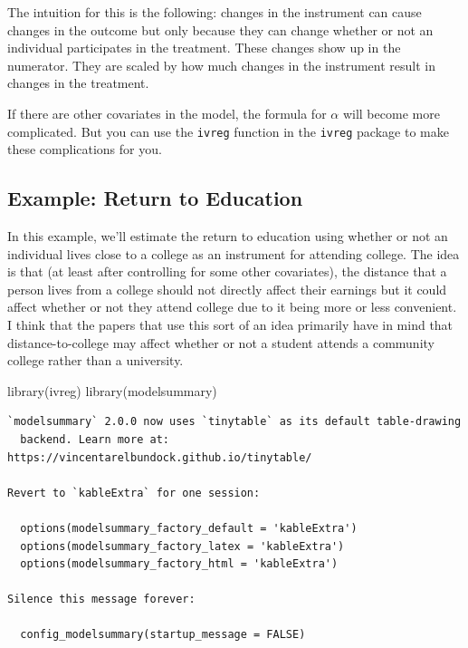 \documentclass[
  letterpaper,
  DIV=11,
  numbers=noendperiod]{scrreprt}
\newenvironment{Shaded}{\begin{snugshade}}{\end{snugshade}}
\newcommand{\FunctionTok}[1]{\textcolor[rgb]{0.28,0.35,0.67}{#1}}
\newcommand{\NormalTok}[1]{\textcolor[rgb]{0.00,0.23,0.31}{#1}}
\begin{document}
The intuition for this is the following: changes in the instrument can
cause changes in the outcome but only because they can change whether or
not an individual participates in the treatment. These changes show up
in the numerator. They are scaled by how much changes in the instrument
result in changes in the treatment.

If there are other covariates in the model, the formula for \(\alpha\)
will become more complicated. But you can use the \texttt{ivreg}
function in the \texttt{ivreg} package to make these complications for
you.

\subsection{Example: Return to
Education}\label{example-return-to-education}

In this example, we'll estimate the return to education using whether or
not an individual lives close to a college as an instrument for
attending college. The idea is that (at least after controlling for some
other covariates), the distance that a person lives from a college
should not directly affect their earnings but it could affect whether or
not they attend college due to it being more or less convenient. I think
that the papers that use this sort of an idea primarily have in mind
that distance-to-college may affect whether or not a student attends a
community college rather than a university.

\begin{Shaded}
\begin{Highlighting}[]
\FunctionTok{library}\NormalTok{(ivreg)}
\FunctionTok{library}\NormalTok{(modelsummary)}
\end{Highlighting}
\end{Shaded}

\begin{verbatim}
`modelsummary` 2.0.0 now uses `tinytable` as its default table-drawing
  backend. Learn more at: https://vincentarelbundock.github.io/tinytable/

Revert to `kableExtra` for one session:

  options(modelsummary_factory_default = 'kableExtra')
  options(modelsummary_factory_latex = 'kableExtra')
  options(modelsummary_factory_html = 'kableExtra')

Silence this message forever:

  config_modelsummary(startup_message = FALSE)
\end{verbatim}
\end{document}
